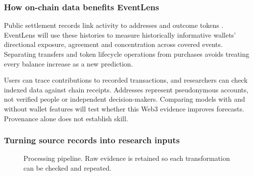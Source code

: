 \subsubsection{How on-chain data benefits EventLens}
Public settlement records link activity to addresses and outcome tokens \cite{polymarketorder}. EventLens will use these histories to measure historically informative wallets' directional exposure, agreement and concentration across covered events. Separating transfers and token lifecycle operations from purchases avoids treating every balance increase as a new prediction.

Users can trace contributions to recorded transactions, and researchers can check indexed data against chain receipts. Addresses represent pseudonymous accounts, not verified people or independent decision-makers. Comparing models with and without wallet features will test whether this Web3 evidence improves forecasts. Provenance alone does not establish skill.


\clearpage
\subsubsection{Turning source records into research inputs}
\begin{figure}[H]
\centering
{}
\caption{Processing pipeline. Raw evidence is retained so each transformation can be checked and repeated.}
\end{figure}

